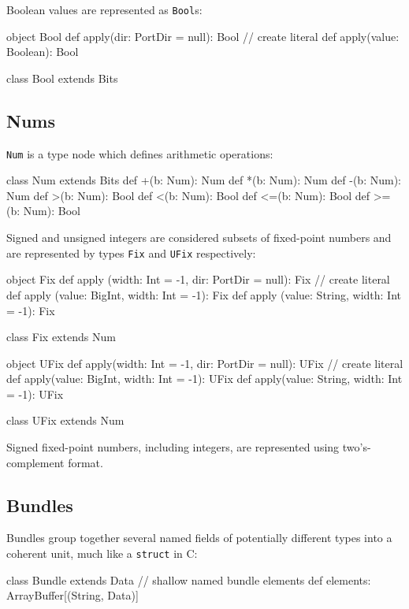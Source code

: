 \documentclass[10pt,twocolumn]{article}
\def\code#1{{\small\tt #1}}
\begin{document}
Boolean values are represented as \code{Bool}s:

\begin{scala}
object Bool {
  def apply(dir: PortDir = null): Bool
  // create literal
  def apply(value: Boolean): Bool
}

class Bool extends Bits
\end{scala}

\subsection{Nums}

\code{Num} is a type node which defines arithmetic operations:

\begin{scala}
class Num extends Bits {
  def +(b: Num): Num
  def *(b: Num): Num
  def -(b: Num): Num
  def >(b: Num): Bool
  def <(b: Num): Bool
  def <=(b: Num): Bool
  def >=(b: Num): Bool
}
\end{scala}

Signed and unsigned integers
are considered subsets of fixed-point numbers and are represented by
types \code{Fix} and \code{UFix} respectively:

\begin{scala}
object Fix {
  def apply (width: Int = -1, 
             dir: PortDir = null): Fix
  // create literal
  def apply (value: BigInt, width: Int = -1): Fix
  def apply (value: String, width: Int = -1): Fix
}

class Fix extends Num 

object UFix {
  def apply(width: Int = -1, 
            dir: PortDir = null): UFix
  // create literal
  def apply(value: BigInt, width: Int = -1): UFix
  def apply(value: String, width: Int = -1): UFix
}

class UFix extends Num 
\end{scala}

\noindent
Signed fixed-point
numbers, including integers, are represented using two's-complement
format.  

\subsection{Bundles}

Bundles group together several named fields of potentially different
types into a coherent unit, much like a \code{struct} in C:

\begin{scala}
class Bundle extends Data {
  // shallow named bundle elements
  def elements: ArrayBuffer[(String, Data)]
}
\end{scala}
\end{document}
